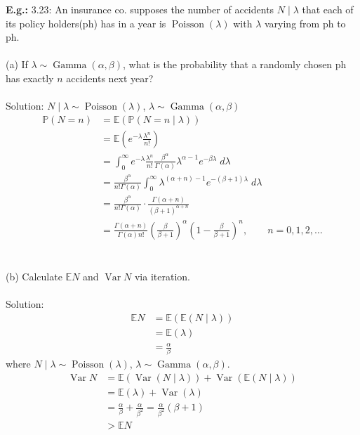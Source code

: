 \documentclass[a4paper]{article}
\newcommand{\n}{\hfill\break}
\newcommand{\eg}[1]{\par\noindent\settowidth{\hangindent}{\textbf{E.g.: }}\textbf{E.g.: }#1\n}
\newcommand{\Prob}{\mathbb{P}}
\renewcommand{\P}{\Prob}
\newcommand{\Avg}{\mathbb{E}}
\newcommand{\E}{\Avg}
\DeclareMathOperator{\Var}{Var}
\DeclareMathOperator{\Poiss}{\text{Poisson}}
\DeclareMathOperator{\Gam}{\text{Gamma}}
\begin{document}
\eg{
    3.23: An insurance co. supposes the number of accidents $N\mid\lambda$ that each of its policy holders(ph) has in a year is $\Poiss(\lambda)$ with $\lambda$ varying from ph to ph. \\\\
    (a) If $\lambda\sim\Gam(\alpha, \beta)$, what is the probability that a randomly chosen ph has exactly $n$ accidents next year?
    \\\\
    Solution: $N\mid\lambda\sim\Poiss(\lambda)$, $\lambda\sim\Gam(\alpha, \beta)$
    \begin{align*}
        \P(N=n)&=\E(\P(N=n\mid \lambda)) \\
        &=\E\left(e^{-\lambda}\frac{\lambda^n}{n!}\right) \\
        &=\int^\infty_0 e^{-\lambda}\frac{\lambda^n}{n!}\frac{\beta^\alpha}{\Gamma(\alpha)}\lambda^{\alpha-1}e^{-\beta\lambda}\;d\lambda \\
        &=\frac{\beta^\alpha}{n!\Gamma(\alpha)}\int^\infty_0\lambda^{(\alpha+n)-1}e^{-(\beta+1)\lambda}\;d\lambda \\
        &=\frac{\beta^\alpha}{n!\Gamma(\alpha)}\cdot\frac{\Gamma(\alpha+n)}{(\beta+1)^{\alpha+n}} \\
        &=\frac{\Gamma(\alpha+n)}{\Gamma(\alpha)n!}\left(\frac{\beta}{\beta+1}\right)^\alpha\left(1-\frac{\beta}{\beta+1}\right)^n,\qquad n=0,1,2,\dots
    \end{align*}
    \\\\
    (b) Calculate $\E N$ and $\Var N$ via iteration.
    \\\\
    Solution: 
    \begin{align*}
        \E N&=\E(\E(N\mid\lambda)) \\
        &=\E(\lambda) \\
        &=\frac{\alpha}{\beta}
    \end{align*}
    where $N\mid\lambda\sim\Poiss(\lambda)$, $\lambda\sim\Gam(\alpha,\beta)$.
    \begin{align*}
        \Var N&=\E(\Var(N\mid\lambda))+\Var(\E(N\mid\lambda)) \\
        &=\E(\lambda)+\Var(\lambda) \\
        &=\frac{\alpha}{\beta}+\frac{\alpha}{\beta^2}=\frac{\alpha}{\beta^2}(\beta+1) \\
        &>\E N
    \end{align*}
}
\end{document}
